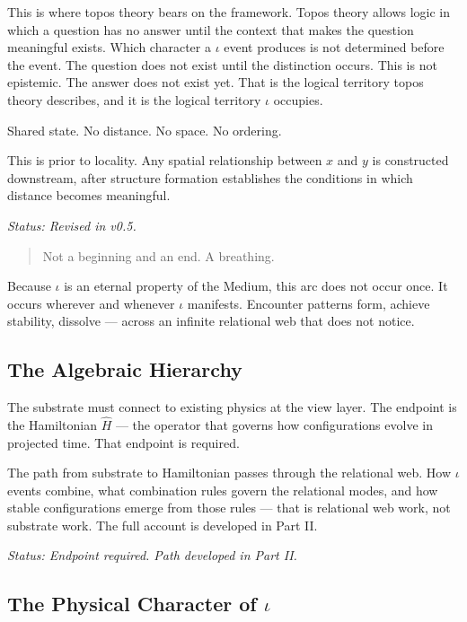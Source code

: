 \documentclass[11pt,letterpaper]{article}
\begin{document}
This is where topos theory bears on the framework. Topos theory allows logic in which a question has no answer until the context that makes the question meaningful exists. Which character a \(\iota\) event produces is not determined before the event. The question does not exist until the distinction occurs. This is not epistemic. The answer does not exist yet. That is the logical territory topos theory describes, and it is the logical territory \(\iota\) occupies.

\begin{center}
Shared state. No distance. No space. No ordering.
\end{center}

This is prior to locality. Any spatial relationship between \(x\) and \(y\) is constructed downstream, after structure formation establishes the conditions in which distance becomes meaningful.

\emph{Status: Revised in v0.5.}

\begin{quote}
Not a beginning and an end. A breathing.
\end{quote}

Because \(\iota\) is an eternal property of the Medium, this arc does not occur once. It occurs wherever and whenever \(\iota\) manifests. Encounter patterns form, achieve stability, dissolve --- across an infinite relational web that does not notice.

\subsection{The Algebraic Hierarchy}
\label{sec:org2ff8b30}

The substrate must connect to existing physics at the view layer. The endpoint is the Hamiltonian \(\hat{H}\) --- the operator that governs how configurations evolve in projected time. That endpoint is required.

The path from substrate to Hamiltonian passes through the relational web. How \(\iota\) events combine, what combination rules govern the relational modes, and how stable configurations emerge from those rules --- that is relational web work, not substrate work. The full account is developed in Part II.

\emph{Status: Endpoint required. Path developed in Part II.}

\subsection{The Physical Character of \(\iota\)}
\label{sec:org630d0f8}
\end{document}
